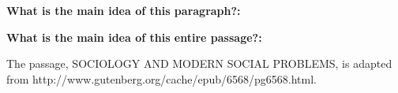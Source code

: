 \begin{enumerate}
\begin{linenumbers}
\end{linenumbers}

\textbf{What is the main idea of this paragraph?:} \hrulefill

\hrulefill

\textbf{What is the main idea of this entire passage?:} \hrulefill

\hrulefill

\hrulefill

The passage, SOCIOLOGY AND MODERN SOCIAL PROBLEMS, is adapted from http://www.gutenberg.org/cache/epub/6568/pg6568.html. 


\end{enumerate}
